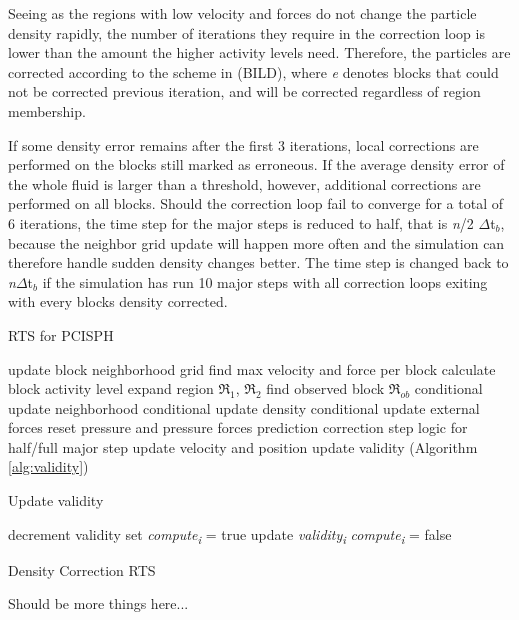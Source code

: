 \documentclass[../../main.tex]{subfiles}
\begin{document}
Seeing as the regions with low velocity and forces do not change the particle density rapidly, the number of iterations they require in the correction loop is lower than the amount the higher activity levels need. Therefore, the particles are corrected according to the scheme in (BILD), where \textit{e} denotes blocks that could not be corrected previous iteration, and will be corrected regardless of region membership. 

If some density error remains after the first 3 iterations, local corrections are performed on the blocks still marked as erroneous. If the average density error of the whole fluid is larger than a threshold, however, additional corrections are performed on all blocks. Should the correction loop fail to converge for a total of 6 iterations, the time step for the major steps is reduced to half, that is \textit{n}/2 $\Delta$t$_b$, because the neighbor grid update will happen more often and the simulation can therefore handle sudden density changes better. The time step is changed back to \textit{n}$\Delta$t$_b$ if the simulation has run 10 major steps with all correction loops exiting with every blocks density corrected. 


\begin{algorithm}[]
    \caption{RTS for PCISPH}
    \label{alg:rts:pcisph}
    \begin{algorithmic}[1]
            \State update block neighborhood grid
            \State find max velocity and force per block
            \State calculate block activity level
            \State expand region $\Re_1$, $\Re_2$
            \State find observed block $\Re_{ob}$
                \State conditional update neighborhood
                \State conditional update density 
                \State conditional update external forces 
                \State reset pressure and pressure forces
                \State prediction correction step
                \State logic for half/full major step
                \State update velocity and position
                \State update validity (Algorithm \ref{alg:validity})
            \EndFor
        \EndWhile
   \end{algorithmic}
\end{algorithm}

 
\begin{algorithm}[h]
    \caption{Update validity}
    \label{alg:validity}
    \begin{algorithmic}[1]
            \State decrement validity
                \State set \textit{{\texorpdfstring{compute\textsubscript{i}}{compute i}}} = true
                \State update \textit{{\texorpdfstring{validity\textsubscript{i}}{validity i}}}
            \Else
                \State \textit{{\texorpdfstring{compute\textsubscript{i}}{compute i}}} = false
            \EndIf
        \EndFor
   \end{algorithmic}
\end{algorithm}


\begin{algorithm}[h]
    \caption{Density Correction RTS}
    \label{alg:rts:correction}
    \begin{algorithmic}[1]
       \State Should be more things here...
   \end{algorithmic}
\end{algorithm}
\end{document}
